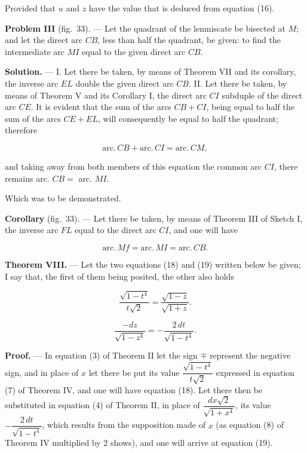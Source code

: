 \documentclass{article}
\begin{document}
Provided that $u$ and $z$ have the value that is deduced from equation (16).

\textbf{Problem III} (fig.~33). --- Let the quadrant of the lemniscate be bisected at $M$; and
let the direct arc $CB$, less than half the quadrant, be given: to find the intermediate arc $MI$
equal to the given direct arc $CB$.


\textbf{Solution.} --- I. Let there be taken, by means of Theorem VII and its corollary, the
inverse arc $EL$ double the given direct arc $CB$. II. Let there be taken, by means of Theorem V
and its Corollary I, the direct arc $CI$ subduple of the direct arc $CE$. It is evident that the
sum of the arcs $CB + CI$,
being equal to half the sum of the arcs $CE + EL$, will consequently be equal to half the
quadrant; therefore

\[ \mathrm{arc.}\,CB + \mathrm{arc.}\,CI = \mathrm{arc.}\,CM, \]

and taking away from both members of this equation the common arc $CI$, there remains arc.
$CB = $ arc. $MI$.

Which was to be demonstrated.

\textbf{Corollary} (fig.~33). --- Let there be taken, by means of Theorem III of Sketch I, the
inverse arc $FL$ equal to the direct arc $CI$, and one will have

\[ \mathrm{arc.}\,Mf = \mathrm{arc.}\,MI = \mathrm{arc.}\,CB. \]

\textbf{Theorem VIII.} --- Let the two equations (18) and (19) written below be given; I say
that, the first of them being posited, the other also holds

\[ \frac{\sqrt{1-t^{4}}}{t\sqrt{2}} = \frac{\sqrt{1-z}}{\sqrt{1+z}}. \tag{18} \]

\[ \frac{-dz}{\sqrt{1-z^{4}}} = -\frac{2\,dt}{\sqrt{1-t^{4}}}. \tag{19} \]

\textbf{Proof.} --- In equation (3) of Theorem II let the sign $\mp$ represent the negative sign,
and in place of $x$ let there be put its value $\dfrac{\sqrt{1-t^{4}}}{t\sqrt{2}}$ expressed in
equation (7) of Theorem IV, and one will have equation (18). Let there then be substituted in
equation (4) of Theorem II, in place of $\dfrac{dx\sqrt{2}}{\sqrt{1+x^{4}}}$, its value
$-\dfrac{2\,dt}{\sqrt{1-t^{4}}}$, which results from the supposition made of $x$ (as equation (8)
of Theorem IV multiplied by 2 shows), and one will arrive at equation (19).
\end{document}
